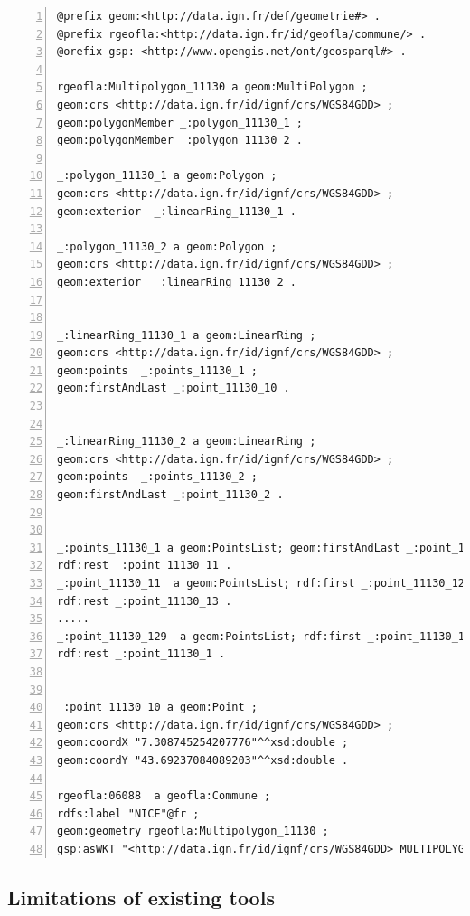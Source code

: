  \begin{lstlisting}[label=lst:nicegeomrdf, float=tp, numbers=left, numberstyle=\tiny, caption = Sample of structured geometry of the city of Nice]
@prefix geom:<http://data.ign.fr/def/geometrie#> .
@prefix rgeofla:<http://data.ign.fr/id/geofla/commune/> .
@orefix gsp: <http://www.opengis.net/ont/geosparql#> .

rgeofla:Multipolygon_11130 a geom:MultiPolygon ;
geom:crs <http://data.ign.fr/id/ignf/crs/WGS84GDD> ;
geom:polygonMember _:polygon_11130_1 ;
geom:polygonMember _:polygon_11130_2 .

_:polygon_11130_1 a geom:Polygon ;
geom:crs <http://data.ign.fr/id/ignf/crs/WGS84GDD> ;
geom:exterior  _:linearRing_11130_1 .

_:polygon_11130_2 a geom:Polygon ;
geom:crs <http://data.ign.fr/id/ignf/crs/WGS84GDD> ;
geom:exterior  _:linearRing_11130_2 .


_:linearRing_11130_1 a geom:LinearRing ;
geom:crs <http://data.ign.fr/id/ignf/crs/WGS84GDD> ;
geom:points  _:points_11130_1 ;
geom:firstAndLast _:point_11130_10 .


_:linearRing_11130_2 a geom:LinearRing ;
geom:crs <http://data.ign.fr/id/ignf/crs/WGS84GDD> ;
geom:points  _:points_11130_2 ;
geom:firstAndLast _:point_11130_2 .


_:points_11130_1 a geom:PointsList; geom:firstAndLast _:point_11130_10 ;
rdf:rest _:point_11130_11 .
_:point_11130_11  a geom:PointsList; rdf:first _:point_11130_12 ;
rdf:rest _:point_11130_13 .
.....
_:point_11130_129  a geom:PointsList; rdf:first _:point_11130_130 ;
rdf:rest _:point_11130_1 .


_:point_11130_10 a geom:Point ;
geom:crs <http://data.ign.fr/id/ignf/crs/WGS84GDD> ;
geom:coordX "7.308745254207776"^^xsd:double ;
geom:coordY "43.69237084089203"^^xsd:double .

rgeofla:06088  a geofla:Commune ;
rdfs:label "NICE"@fr ;
geom:geometry rgeofla:Multipolygon_11130 ;
gsp:asWKT "<http://data.ign.fr/id/ignf/crs/WGS84GDD> MULTIPOLYGON (((7.308745254207776 43.69237084089203, 7.306051040744396 43.68445728916297, ....., 7.308745254207776 43.69237084089203)))"^^gsp:wktLiteral .

\end{lstlisting}


\subsection{Limitations of existing tools}
\label{sec:limitations}

